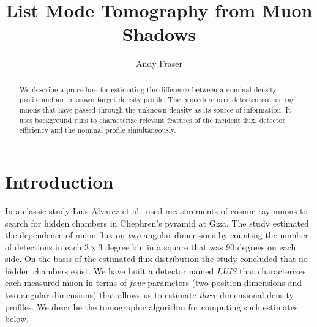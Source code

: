 \documentclass[twocolumn]{article}
\title{List Mode Tomography from Muon Shadows}
\author{Andy Fraser}
\begin{document}
\maketitle
\begin{abstract}
  We describe a procedure for estimating the difference between a
  nominal density profile and an unknown target density profile. The
  procedure uses detected cosmic ray muons that have passed through
  the unknown density as its source of information.  It uses
  background runs to characterize relevant features of the incident
  flux, detector efficiency and the nominal profile simultaneously.
\end{abstract}

\section{Introduction}
\label{sec:introduction}

In a classic study\cite{Alvarez70} Luis Alvarez et al.\ used
measurements of cosmic ray muons to search for hidden chambers in
Chephren's pyramid at Giza.  The study estimated the dependence of
muon flux on \emph{two} angular dimensions by counting the number of
detections in each $3\times 3$ degree bin in a square that was 90
degrees on each side.  On the basis of the estimated flux distribution
the study concluded that no hidden chambers exist.  We have built a
detector named \emph{LUIS}\cite{Green10} that characterizes each
measured muon in terms of \emph{four} parameters (two position
dimensions and two angular dimensions) that allows us to estimate
\emph{three} dimensional density profiles.  We describe the
tomographic algorithm for computing such estimates below.
\end{document}
